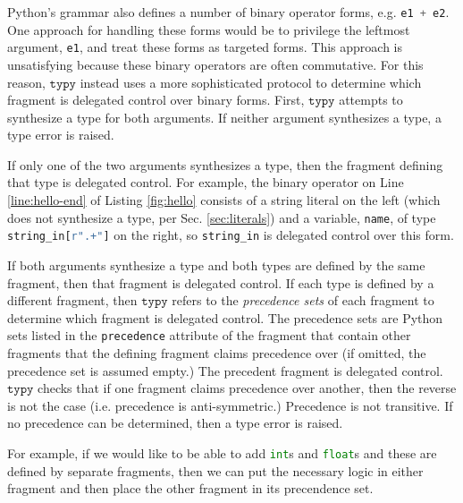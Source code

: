 \documentclass[preprint,10pt]{sigplanconf}
\newcommand{\typy}{\texttt{typy}}
\newcommand{\lip}[1]{\lstinline[language=Python,basicstyle=\ttfamily\footnotesize,deletendkeywords={tuple,buffer,map}]{#1}}
\newcommand{\li}[1]{\lip{#1}}
\begin{document}
Python's grammar also defines a number of binary operator forms, e.g. \li{e1 + e2}. One approach for handling these forms would be to privilege the leftmost argument, \li{e1}, and treat these forms as targeted forms. This approach is unsatisfying because these binary operators are often commutative. For this reason, $\typy$ instead uses a more sophisticated protocol to determine which fragment is delegated control over binary forms. First, $\typy$ attempts to synthesize a type for both arguments.
If neither argument synthesizes a type, a type error is raised. 

If only one of the two arguments synthesizes a type, then the fragment defining that type is delegated control. For example, the binary operator on Line \ref{line:hello-end} of Listing \ref{fig:hello} consists of a string literal on the left (which does not synthesize a type, per Sec. \ref{sec:literals}) and a variable, \li{name}, of type \li{string_in[r".+"]} on the right, so \li{string_in} is delegated control over this form.

If both arguments synthesize a type and both types are defined by the same fragment, then that fragment is delegated control. If each type is defined by a different fragment, then $\typy$ refers to the \emph{precedence sets} of each fragment to determine which fragment is delegated control. The precedence sets are Python sets listed in the \li{precedence} attribute of the fragment that contain other fragments that the defining fragment claims precedence over (if omitted, the precedence set is assumed empty.) The precedent fragment is delegated control. $\typy$ checks that if one fragment claims precedence over another, then the reverse is not the case (i.e. precedence is anti-symmetric.) Precedence is not transitive. If no precedence can be determined, then a type error is raised.%

For example, if we would like to be able to add \li{int}s and \li{float}s and these are defined by separate fragments, then we can put the necessary logic in either fragment and then place the other fragment in its precendence set.

\end{document}
